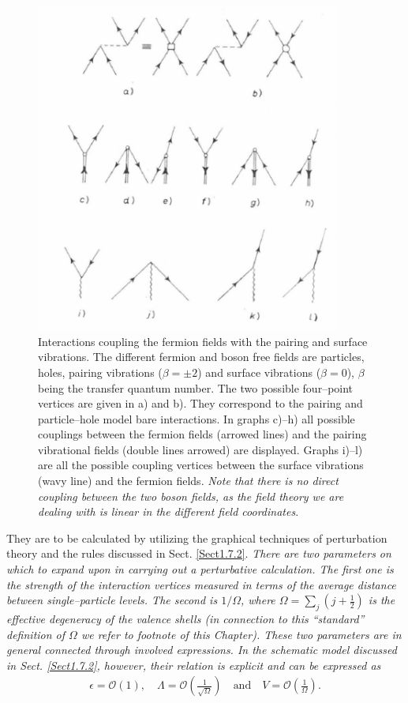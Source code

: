      \begin{figure}
     \centerline {
     \includegraphics*[width=10cm]{introduccion/figs/fig23}
     }
     \caption{Interactions coupling the fermion fields with the pairing and surface vibrations. The different fermion and boson free fields are particles, holes, pairing vibrations ($\beta=\pm2$) and surface vibrations ($\beta=0$), $\beta$ being the transfer quantum number. The two possible four--point vertices are given in a) and b). They correspond to the pairing and particle--hole model bare interactions. In graphs c)--h) all possible couplings between the fermion fields (arrowed lines) and the pairing vibrational fields (double lines arrowed) are displayed. Graphs i)--l) are all the possible coupling vertices between the surface vibrations (wavy line) and the fermion fields. \textit{Note that there is no direct coupling between the two boson fields, as the field theory we are dealing with is linear in the different field coordinates}.}
     \label{figC1A6}
     \end{figure}

They are to be calculated by utilizing the graphical techniques of perturbation theory and the rules discussed in Sect. \ref{Sect1.7.2}. 
\textit{There are two parameters on which to expand upon in carrying out a perturbative  calculation. The first one is the strength of the interaction vertices measured in terms of the average distance between single--particle levels. The second is $1/\Omega$, where $\Omega=\sum_j(j+\frac{1}{2})$ is the effective degeneracy of the valence shells (in connection to this ``standard'' definition of $\Omega$ we refer to footnote  of this Chapter). These two parameters are in general connected through involved expressions. In the schematic model discussed in Sect. \ref{Sect1.7.2}, however, their relation is explicit and can be expressed as}
  \begin{align}\label{eqC1A86} 
   \epsilon=\mathcal O(1),\quad \Lambda=\mathcal O\left(\frac{1}{\sqrt{\Omega}}\right)\quad \text{and}\quad V=\mathcal O\left(\frac{1}{\Omega}\right).
    \end{align}   

